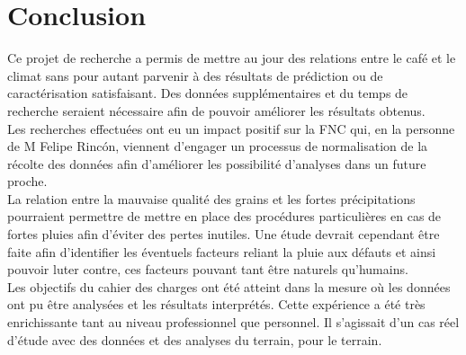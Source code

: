 

\chapter{Conclusion}










Ce projet de recherche a permis de mettre au jour des relations entre le café et le climat sans pour autant parvenir à des résultats de prédiction ou de caractérisation satisfaisant. Des données supplémentaires et du temps de recherche seraient nécessaire afin de pouvoir améliorer les résultats obtenus. \\

\noindent Les recherches effectuées ont eu un impact positif sur la FNC qui, en la personne de M Felipe Rincón, viennent d'engager un processus de normalisation de la récolte des données afin d'améliorer les possibilité d'analyses dans un future proche. \\

\noindent La relation entre la mauvaise qualité des grains et les fortes précipitations pourraient permettre de mettre en place des procédures particulières en cas de fortes pluies afin d'éviter des pertes inutiles. Une étude devrait cependant être faite afin d'identifier les éventuels facteurs reliant la pluie aux défauts et ainsi pouvoir luter contre, ces facteurs pouvant tant être naturels qu'humains. \\

\noindent Les objectifs du cahier des charges ont été atteint dans la mesure où les données ont pu être analysées et les résultats interprétés. Cette expérience a été très enrichissante tant au niveau professionnel que personnel. Il s'agissait d'un cas réel d'étude avec des données et des analyses du terrain, pour le terrain. 



